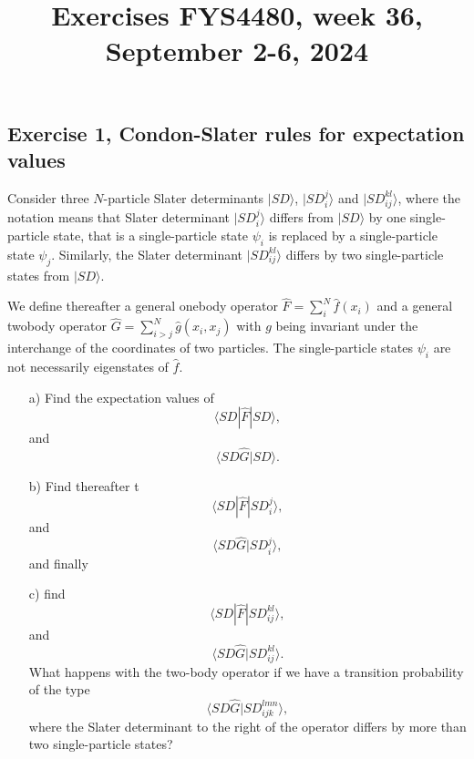 \documentclass[prc]{revtex4}
\begin{document}
\title{Exercises FYS4480, week 36, September 2-6, 2024}
\maketitle
\subsection*{Exercise 1, Condon-Slater rules for expectation values}
Consider three $N$-particle 
Slater determinants $|SD\rangle$, $|SD_i^j\rangle$ and $|SD_{ij}^{kl}\rangle$, where the notation means that 
Slater determinant $|SD_i^j\rangle$ differs from $|SD\rangle$ by one single-particle state, that is a single-particle
state $\psi_i$ is replaced by a single-particle state $\psi_j$. Similarly, the Slater determinant $|SD_{ij}^{kl}\rangle$
differs by two single-particle states from $|SD\rangle$.

We define thereafter a general onebody operator $\hat{F} = \sum_{i}^N\hat{f}(x_{i})$ and a general 
twobody operator $\hat{G}=\sum_{i>j}^N\hat{g}(x_{i},x_{j})$
with $g$ being invariant under the interchange of the coordinates of two particles.
The single-particle states $\psi_i$ are not necessarily eigenstates of $\hat{f}$.
\begin{enumerate}
\item[a)] Find the expectation values of 
\[
\langle SD |\hat{F}|SD\rangle,
\]
and
\[
\langle SD\hat{G}|SD\rangle.
\]
\item[b)] Find thereafter t
\[
\langle SD |\hat{F}|SD_i^j\rangle,
\]
and
\[
\langle SD\hat{G}|SD_i^j\rangle,
\]
and finally
\item[c)] find 
\[
\langle SD |\hat{F}|SD_{ij}^{kl}\rangle,
\]
and
\[
\langle SD\hat{G}|SD_{ij}^{kl}\rangle.
\]
What happens with the two-body operator if we have a transition probability  of the type
\[
\langle SD\hat{G}|SD_{ijk}^{lmn}\rangle,
\]
where the Slater determinant to the right of the operator differs by more than two single-particle states?
\end{enumerate}
\end{document}
